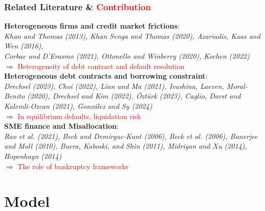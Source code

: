 \documentclass[aspectratio=169,xcolor=table]{beamer}
\begin{document}
\begin{frame}[label=lit] \frametitle{Related Literature \& \textcolor{red}{Contribution} }

\textbf{Heterogeneous firms and credit market frictions}: \\
\footnotesize \textit{Khan and Thomas (2013), Khan Senga and Thomas (2020), Azariadis, Kaas and Wen (2016), \\ Corbae and D'Erasmo (2021), Ottonello and Winberry (2020), Kochen (2022)} \normalsize \\ 
\qquad $\Rightarrow$ \textcolor{red}{Heterogeneity of debt contract and default resolution} \vspace{3mm} \\

\textbf{Heterogeneous debt contracts and borrowing constraint}: \\
\footnotesize \textit{Drechsel (2023), Choi (2022), Lian and Ma (2021), Ivashina, Laeven, Moral-Benito (2020), Drechsel and Kim (2022), Öztürk (2023), Caglio, Darst and Kalemli-Ozcan (2021), González and Sy (2024)} \normalsize \\ 
\qquad $\Rightarrow$ \textcolor{red}{In equilibrium defaults, liquidation risk}\vspace{3mm} \\

\textbf{SME finance and Misallocation}: \\
\footnotesize \textit{Rao et al. (2021), Beck and Demirguc-Kunt (2006), Beck et al. (2006), Banerjee and Moll (2010), Buera, Kaboski, and Shin (2011), Midrigan and Xu (2014), Hopenhayn (2014)} \\ \normalsize 
\qquad $\Rightarrow$ \textcolor{red}{The role of bankruptcy frameworks}

\end{frame} 



\section{Model}
\end{document}
